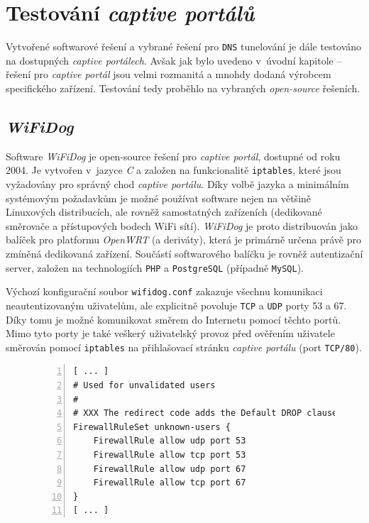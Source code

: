 \documentclass[thesis=M,czech]{FITthesis}[2012/10/20]
\begin{document}
    
\section{Testování \textit{captive portálů}}

Vytvořené softwarové řešení a vybrané řešení pro \texttt{DNS} tunelování je dále testováno na dostupných \textit{captive portálech}. Avšak jak bylo uvedeno v~úvodní kapitole -- řešení pro \textit{captive portál} jsou velmi rozmanitá a mnohdy dodaná výrobcem specifického zařízení. Testování tedy proběhlo na vybraných \textit{open-source} řešeních.

\subsection{\textit{WiFiDog}}

Software \textit{WiFiDog} je open-source řešení pro \textit{captive portál}, dostupné od roku 2004. Je vytvořen v~jazyce \textit{C} a založen na funkcionalitě \texttt{iptables}, které jsou vyžadovány pro správný chod \textit{captive portálu}. Díky volbě jazyka a minimálním systémovým požadavkům je možné používat software nejen na většině Linuxových distribucích, ale rovněž samostatných zařízeních (dedikované směrovače a přístupových bodech WiFi sítí). \textit{WiFiDog} je proto distribuován jako balíček pro platformu \textit{OpenWRT} (a deriváty), která je primárně určena právě pro zmíněná dedikovaná zařízení. Součástí softwarového balíčku je rovněž autentizační server, založen na technologiích \texttt{PHP} a \texttt{PostgreSQL} (případně \texttt{MySQL}).

Výchozí konfigurační soubor \texttt{wifidog.conf} zakazuje všechnu komunikaci neautentizovaným uživatelům, ale explicitně povoluje \texttt{TCP} a \texttt{UDP} porty 53 a 67. Díky tomu je možné komunikovat směrem do Internetu pomocí těchto portů. Mimo tyto porty je také veškerý uživatelský provoz před ověřením uživatele směrován pomocí \texttt{iptables} na přihlašovací stránku \textit{captive portálu} (port \texttt{TCP/80}).

    \begin{figure}[h]
	\begin{lstlisting}[label=code:iperf,caption=Část výchozího konfiguračního souboru captive portálu WiFiDog,frame=single,numbers=left]
[ ... ]
# Used for unvalidated users
#
# XXX The redirect code adds the Default DROP clause.
FirewallRuleSet unknown-users {
    FirewallRule allow udp port 53
    FirewallRule allow tcp port 53
    FirewallRule allow udp port 67
    FirewallRule allow tcp port 67
}
[ ... ]
      \end{lstlisting}
    \end{figure}
\end{document}
